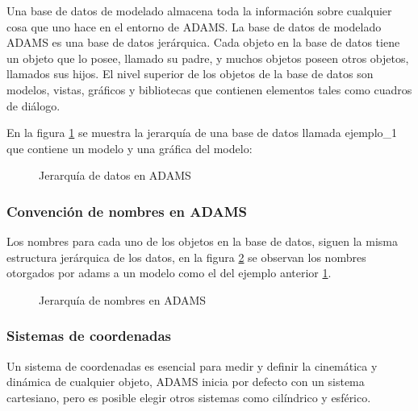         Una base de datos de modelado almacena toda la información sobre cualquier cosa que uno hace en el entorno de ADAMS. La base de datos de modelado ADAMS es una base de datos jerárquica. Cada objeto en la base de datos tiene un objeto que lo posee, llamado su padre, y muchos objetos poseen otros objetos, llamados sus hijos. El nivel superior de los objetos de la base de datos son modelos, vistas, gráficos y bibliotecas que contienen elementos tales como cuadros de diálogo. 
        
        En la figura \ref{f:Cap3-adams_jerarquia_datos} se muestra la jerarquía de una base de datos llamada ejemplo\_1 que contiene un modelo y una gráfica del modelo:
    
    
        \begin{figure}[H]
            \centering
            
            \caption{Jerarquía de datos en ADAMS}
            \label{f:Cap3-adams_jerarquia_datos}
        \end{figure} 
        
        
        \subsubsection{Convención de nombres en ADAMS}
        
        Los nombres para cada uno de los objetos en la base de datos, siguen la misma estructura jerárquica de los datos, en la figura \ref{f:Cap3-adams_jerarquia_nombres} se observan los nombres otorgados por adams a un modelo como el del ejemplo anterior \ref{f:Cap3-adams_jerarquia_datos}.
        
        \begin{figure}[H]
            \centering
            
            \caption{Jerarquía de nombres en ADAMS}
            \label{f:Cap3-adams_jerarquia_nombres}
        \end{figure} 
        
        \subsubsection{Sistemas de coordenadas}
        
        Un sistema de coordenadas es esencial para medir y definir la cinemática y dinámica de cualquier objeto, ADAMS inicia por defecto con un sistema cartesiano, pero es posible elegir otros sistemas como cilíndrico y esférico.
        
